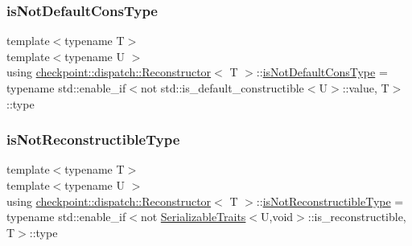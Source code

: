 \mbox{\label{structcheckpoint_1_1dispatch_1_1_reconstructor_a0062e5edfdd87b34c3e5464d1f1020ec}} 
\subsubsection{\texorpdfstring{is\+Not\+Default\+Cons\+Type}{isNotDefaultConsType}}
{\footnotesize\ttfamily template$<$typename T$>$ \\
template$<$typename U $>$ \\
using \hyperlink{structcheckpoint_1_1dispatch_1_1_reconstructor}{checkpoint\+::dispatch\+::\+Reconstructor}$<$ T $>$\+::\hyperlink{structcheckpoint_1_1dispatch_1_1_reconstructor_a0062e5edfdd87b34c3e5464d1f1020ec}{is\+Not\+Default\+Cons\+Type} =  typename std\+::enable\+\_\+if$<$not std\+::is\+\_\+default\+\_\+constructible$<$U$>$\+::value, T$>$\+::type}

\mbox{\label{structcheckpoint_1_1dispatch_1_1_reconstructor_a36da09eb87ef3c1b45c0cdba27895f72}} 
\subsubsection{\texorpdfstring{is\+Not\+Reconstructible\+Type}{isNotReconstructibleType}}
{\footnotesize\ttfamily template$<$typename T$>$ \\
template$<$typename U $>$ \\
using \hyperlink{structcheckpoint_1_1dispatch_1_1_reconstructor}{checkpoint\+::dispatch\+::\+Reconstructor}$<$ T $>$\+::\hyperlink{structcheckpoint_1_1dispatch_1_1_reconstructor_a36da09eb87ef3c1b45c0cdba27895f72}{is\+Not\+Reconstructible\+Type} =  typename std\+::enable\+\_\+if$<$not \hyperlink{structcheckpoint_1_1_serializable_traits}{Serializable\+Traits}$<$U,void$>$\+::is\+\_\+reconstructible, T$>$\+::type}

